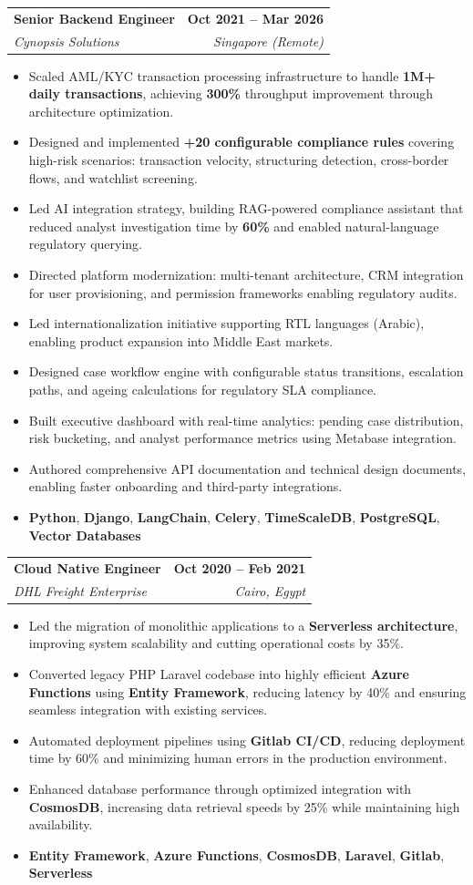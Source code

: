 \documentclass[letterpaper,11pt]{article}
\makeatletter
\newcommand{\resumeItem}[1]{
  \item\small{
    {#1 \vspace{-2pt}}
  }
}
\newcommand{\resumeSubheading}[4]{
  \vspace{-2pt}\item
    \begin{tabular*}{1.0\textwidth}[t]{l@{\extracolsep{\fill}}r}
      \textbf{#1} & \textbf{\small #2} \\
      \textit{\small#3} & \textit{\small #4} \\
    \end{tabular*}\vspace{-7pt}
}
\newcommand{\resumeItemListStart}{\begin{itemize}}
\newcommand{\resumeItemListEnd}{\end{itemize}\vspace{-5pt}}
\makeatother
\begin{document}
    \resumeSubheading
      {Senior Backend Engineer}{Oct 2021 – Mar 2026}
      {Cynopsis Solutions}{Singapore (Remote)}
      \resumeItemListStart
        \resumeItem{Scaled AML/KYC transaction processing infrastructure to handle \textbf{1M+ daily transactions}, achieving \textbf{300\%} throughput improvement through architecture optimization.}
        \resumeItem{Designed and implemented \textbf{+20 configurable compliance rules} covering high-risk scenarios: transaction velocity, structuring detection, cross-border flows, and watchlist screening.}
        \resumeItem{Led AI integration strategy, building RAG-powered compliance assistant that reduced analyst investigation time by \textbf{60\%} and enabled natural-language regulatory querying.}
        \resumeItem{Directed platform modernization: multi-tenant architecture, CRM integration for user provisioning, and permission frameworks enabling regulatory audits.}
        \resumeItem{Led internationalization initiative supporting RTL languages (Arabic), enabling product expansion into Middle East markets.}
        \resumeItem{Designed case workflow engine with configurable status transitions, escalation paths, and ageing calculations for regulatory SLA compliance.}
        \resumeItem{Built executive dashboard with real-time analytics: pending case distribution, risk bucketing, and analyst performance metrics using Metabase integration.}
        \resumeItem{Authored comprehensive API documentation and technical design documents, enabling faster onboarding and third-party integrations.}
        \resumeItem{\textbf{Python}, \textbf{Django}, \textbf{LangChain}, \textbf{Celery}, \textbf{TimeScaleDB}, \textbf{PostgreSQL}, \textbf{Vector Databases}}
      \resumeItemListEnd

    \resumeSubheading
      {Cloud Native Engineer}{Oct 2020 – Feb 2021}
      {DHL Freight Enterprise}{Cairo, Egypt}
      \resumeItemListStart
        \resumeItem{Led the migration of monolithic applications to a \textbf{Serverless architecture}, improving system scalability and cutting operational costs by 35\%.}
        \resumeItem{Converted legacy PHP Laravel codebase into highly efficient \textbf{Azure Functions} using \textbf{Entity Framework}, reducing latency by 40\% and ensuring seamless integration with existing services.}
        \resumeItem{Automated deployment pipelines using \textbf{Gitlab CI/CD}, reducing deployment time by 60\% and minimizing human errors in the production environment.}
        \resumeItem{Enhanced database performance through optimized integration with \textbf{CosmosDB}, increasing data retrieval speeds by 25\% while maintaining high availability.}
        \resumeItem{\textbf{Entity Framework}, \textbf{Azure Functions}, \textbf{CosmosDB}, \textbf{Laravel}, \textbf{Gitlab}, \textbf{Serverless}}
    \resumeItemListEnd
\end{document}
